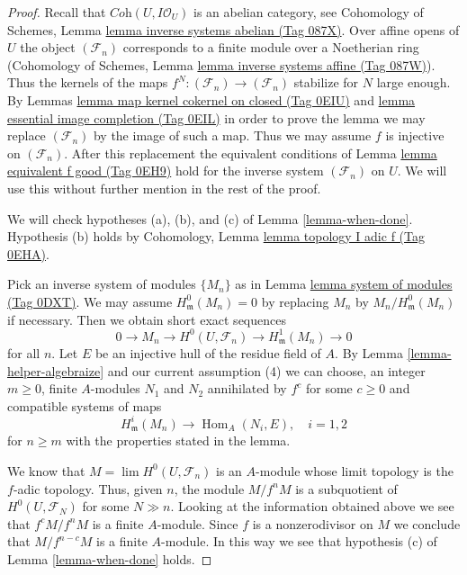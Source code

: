 \documentclass{amsart}
\theoremstyle{plain}
\theoremstyle{definition}
\theoremstyle{remark}
\numberwithin{equation}{subsection}
\def\lim{\mathop{\mathrm{lim}}\nolimits}
\def\Hom{\mathop{\mathrm{Hom}}\nolimits}
\begin{document}
\begin{proof}
Recall that $\textit{Coh}(U, I\mathcal{O}_U)$ is an abelian category, see
Cohomology of Schemes, Lemma \href{https://stacks.math.columbia.edu/tag/087X}{lemma inverse systems abelian (Tag 087X)}.
Over affine opens of $U$ the object $(\mathcal{F}_n)$
corresponds to a finite module over a Noetherian ring
(Cohomology of Schemes, Lemma \href{https://stacks.math.columbia.edu/tag/087W}{lemma inverse systems affine (Tag 087W)}).
Thus the kernels of the maps $f^N : (\mathcal{F}_n) \to (\mathcal{F}_n)$
stabilize for $N$ large enough. By
Lemmas \href{https://stacks.math.columbia.edu/tag/0EIU}{lemma map kernel cokernel on closed (Tag 0EIU)} and
\href{https://stacks.math.columbia.edu/tag/0EIL}{lemma essential image completion (Tag 0EIL)}
in order to prove the lemma
we may replace $(\mathcal{F}_n)$ by the image of such a map.
Thus we may assume $f$ is injective on $(\mathcal{F}_n)$.
After this replacement the equivalent conditions of
Lemma \href{https://stacks.math.columbia.edu/tag/0EH9}{lemma equivalent f good (Tag 0EH9)} hold for the inverse system
$(\mathcal{F}_n)$ on $U$. We will use this without further mention
in the rest of the proof.

\medskip\noindent
We will check hypotheses (a), (b), and (c) of
Lemma \ref{lemma-when-done}. Hypothesis (b) holds by
Cohomology, Lemma \href{https://stacks.math.columbia.edu/tag/0EHA}{lemma topology I adic f (Tag 0EHA)}.

\medskip\noindent
Pick an inverse system of modules $\{M_n\}$ as in
Lemma \href{https://stacks.math.columbia.edu/tag/0DXT}{lemma system of modules (Tag 0DXT)}.
We may assume $H^0_\mathfrak m(M_n) = 0$ by replacing $M_n$ by
$M_n/H^0_\mathfrak m(M_n)$ if necessary. Then we obtain short exact
sequences
$$
0 \to M_n \to H^0(U, \mathcal{F}_n) \to H^1_\mathfrak m(M_n) \to 0
$$
for all $n$. Let $E$ be an injective hull of the residue field of $A$.
By Lemma \ref{lemma-helper-algebraize} and our current assumption (4)
we can choose, an integer $m \geq 0$, finite $A$-modules
$N_1$ and $N_2$ annihilated by $f^c$ for some $c \geq 0$ and
compatible systems of maps
$$
H^i_\mathfrak m(M_n) \to \Hom_A(N_i, E), \quad i = 1, 2
$$
for $n \geq m$
with the properties stated in the lemma.

\medskip\noindent
We know that $M = \lim H^0(U, \mathcal{F}_n)$ is an $A$-module whose
limit topology is the $f$-adic topology. Thus, given $n$, the module
$M/f^nM$ is a subquotient of $H^0(U, \mathcal{F}_N)$ for some $N \gg n$.
Looking at the information obtained above we see that
$f^cM/f^nM$ is a finite $A$-module. Since $f$ is a nonzerodivisor
on $M$ we conclude that $M/f^{n - c}M$ is a finite $A$-module.
In this way we see that hypothesis (c) of Lemma \ref{lemma-when-done} holds.


\end{proof}
\end{document}
